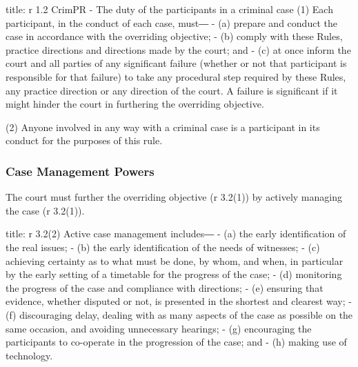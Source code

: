 \documentclass[
]{article}
\newenvironment{Shaded}{}{}
\newcommand{\NormalTok}[1]{#1}
\begin{document}
\begin{Shaded}
\begin{Highlighting}[]
\NormalTok{title: r 1.2 CrimPR {-} The duty of the participants in a criminal case}
\NormalTok{(1) Each participant, in the conduct of each case, must―}
\NormalTok{{-} (a) prepare and conduct the case in accordance with the overriding objective;}
\NormalTok{{-} (b) comply with these Rules, practice directions and directions made by the court; and}
\NormalTok{{-} (c) at once inform the court and all parties of any significant failure (whether or not that participant is responsible for that failure) to take any procedural step required by these Rules, any practice direction or any direction of the court. A failure is significant if it might hinder the court in furthering the overriding objective.}

\NormalTok{(2) Anyone involved in any way with a criminal case is a participant in its conduct for the purposes of this rule.}
\end{Highlighting}
\end{Shaded}

\hypertarget{case-management-powers}{%
\subsubsection{Case Management Powers}\label{case-management-powers}}

The court must further the overriding objective (r 3.2(1)) by actively
managing the case (r 3.2(1)).

\begin{Shaded}
\begin{Highlighting}[]
\NormalTok{title: r 3.2(2)}
\NormalTok{Active case management includes―}
\NormalTok{{-} (a) the early identification of the real issues;}
\NormalTok{{-} (b) the early identification of the needs of witnesses;}
\NormalTok{{-} (c) achieving certainty as to what must be done, by whom, and when, in particular by the early setting of a timetable for the progress of the case;}
\NormalTok{{-} (d) monitoring the progress of the case and compliance with directions;}
\NormalTok{{-} (e) ensuring that evidence, whether disputed or not, is presented in the shortest and clearest way;}
\NormalTok{{-} (f) discouraging delay, dealing with as many aspects of the case as possible on the same occasion, and avoiding unnecessary hearings;}
\NormalTok{{-} (g) encouraging the participants to co{-}operate in the progression of the case; and}
\NormalTok{{-} (h) making use of technology.}
\end{Highlighting}
\end{Shaded}
\end{document}
